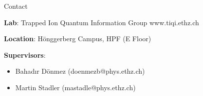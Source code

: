 \documentclass{project-proposal}
\begin{document}
\begin{section}{Contact}

 \textbf{Lab}:\newline
 Trapped Ion Quantum Information Group\newline
 www.tiqi.ethz.ch \newline

 \textbf{Location}:\newline
 Hönggerberg Campus, HPF (E Floor)\newline

 \textbf{Supervisors}:
 \begin{itemize}
     \item {Bahadır Dönmez (doenmezb@phys.ethz.ch)}
     \item {Martin Stadler (mastadle@phys.ethz.ch)}
 \end{itemize}

\end{section}
\end{document}
